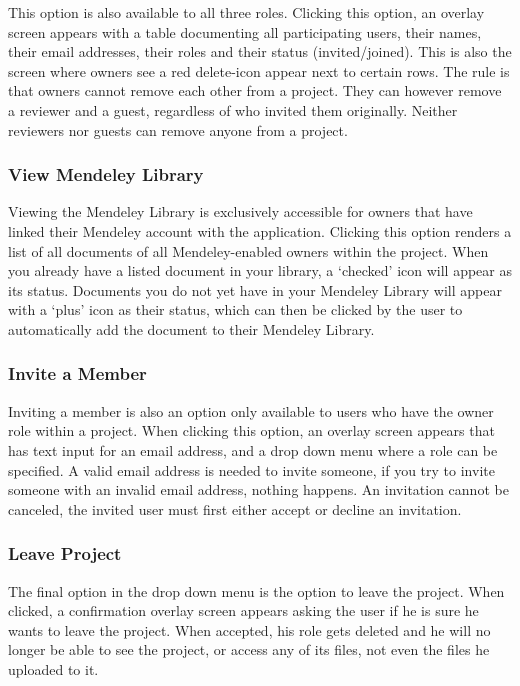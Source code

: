 This option is also available to all three roles. Clicking this option, an overlay screen appears with a table documenting all participating
users, their names, their email addresses, their roles and their status (invited/joined). This is also the screen where owners see a red
delete-icon appear next to certain rows. The rule is that owners cannot remove each other from a project. They can however remove a reviewer 
and a guest, regardless of who invited them originally. Neither reviewers nor guests can remove anyone from a project.

\subsubsection{View Mendeley Library}

Viewing the Mendeley Library is exclusively accessible for owners that have linked their Mendeley account with the application. Clicking this
option renders a list of all documents of all Mendeley-enabled owners within the project. When you already have a listed document in your library, a 
`checked' icon will appear as its status. Documents you do not yet have in your Mendeley Library will appear with a `plus' icon as their status,
which can then be clicked by the user to automatically add the document to their Mendeley Library.

\subsubsection{Invite a Member}

Inviting a member is also an option only available to users who have the owner role within a project. When clicking this option, an overlay
screen appears that has text input for an email address, and a drop down menu where a role can be specified. A valid email address is needed
to invite someone, if you try to invite someone with an invalid email address, nothing happens. An invitation cannot be canceled, the 
invited user must first either accept or decline an invitation.

\subsubsection{Leave Project}

The final option in the drop down menu is the option to leave the project. When clicked, a confirmation overlay screen appears asking the user
if he is sure he wants to leave the project. When accepted, his role gets deleted and he will no longer be able to see the project, or
access any of its files, not even the files he uploaded to it. 


